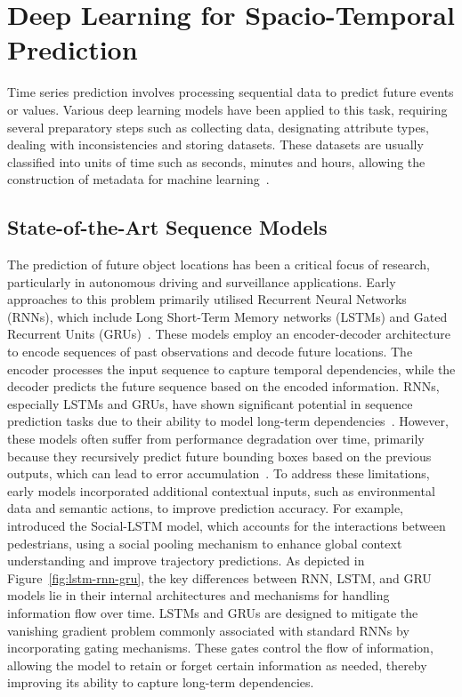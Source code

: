\documentclass[12pt,oneside]{book} %
\begin{document}
\newpage
\section{Deep Learning for Spacio-Temporal Prediction}
Time series prediction involves processing sequential data to predict future
events or values. Various deep learning models have been applied to this task,
requiring several preparatory steps such as collecting data, designating
attribute types, dealing with inconsistencies and storing datasets. These
datasets are usually classified into units of time such as seconds, minutes and
hours, allowing the construction of metadata for machine
learning~\cite{FFPSpaceSystemVehicles}.

\subsection*{State-of-the-Art Sequence Models}

The prediction of future object locations has been a critical focus of
research, particularly in autonomous driving and surveillance applications.
Early approaches to this problem primarily utilised Recurrent Neural Networks
(RNNs), which include Long Short-Term Memory networks (LSTMs) and Gated
Recurrent Units (GRUs)~\cite{Alemany2019, Bemporad2023,
    PredictionHeadMovement360Degrees, Feng2018, HurricanesFPP}. These models employ
an encoder-decoder architecture to encode sequences of past observations and
decode future locations. The encoder processes the input sequence to capture
temporal dependencies, while the decoder predicts the future sequence based on
the encoded information. RNNs, especially LSTMs and GRUs, have shown
significant potential in sequence prediction tasks due to their ability to
model long-term dependencies~\cite{CubicLSTMsVideoPrediction, ConvLSTM,
    DBLP:journals/corr/SrivastavaMS15}. However, these models often suffer from
performance degradation over time, primarily because they recursively predict
future bounding boxes based on the previous outputs, which can lead to error
accumulation~\cite{FusionGRU}. To address these limitations, early models
incorporated additional contextual inputs, such as environmental data and
semantic actions, to improve prediction accuracy. For example,
\citet{Alahi2016} introduced the Social-LSTM model, which accounts for the
interactions between pedestrians, using a social pooling mechanism to enhance
global context understanding and improve trajectory predictions. As depicted in
Figure~\ref{fig:lstm-rnn-gru}, the key differences between RNN, LSTM, and GRU
models lie in their internal architectures and mechanisms for handling
information flow over time. LSTMs and GRUs are designed to mitigate the
vanishing gradient problem commonly associated with standard RNNs by
incorporating gating mechanisms. These gates control the flow of information,
allowing the model to retain or forget certain information as needed, thereby
improving its ability to capture long-term dependencies.
\end{document}
